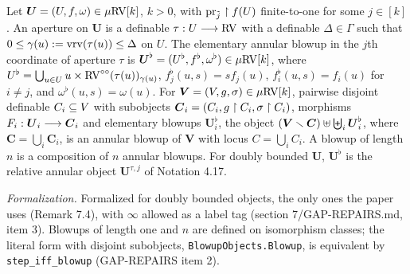 \setcounter{theorem}{1}
\begin{definition}
\label{defn-blowup-coa}
\leanok
{}
Let $\boldsymbol{U} = (U, f, \omega) \in \mu\mathrm{RV}[k]$, $k > 0$, with $\operatorname{pr}_{\tilde j} \upharpoonright f(U)$ finite-to-one for some $j \in [k]$. An aperture on $\boldsymbol{U}$ is a definable $\tau : U \longrightarrow \mathrm{RV}$ with a definable $\Delta \in \Gamma$ such that $0 \leq \gamma(u) := \operatorname{vrv}(\tau(u)) \leq \Delta$ on $U$. The elementary annular blowup in the $j$th coordinate of aperture $\tau$ is $\boldsymbol{U}^\flat = (U^\flat, f^\flat, \omega^\flat) \in \mu\mathrm{RV}[k]$, where $U^\flat = \bigcup_{u \in U} u \times \mathrm{RV}^{\circ\circ}(\tau(u))_{\gamma(u)}$, $f^\flat_j(u, s) = s f_j(u)$, $f^\flat_i(u, s) = f_i(u)$ for $i \neq j$, and $\omega^\flat(u, s) = \omega(u)$. For $\boldsymbol{V} = (V, g, \sigma) \in \mu\mathrm{RV}[k]$, pairwise disjoint definable $C_i \subseteq V$ with subobjects $\boldsymbol{C}_i = (C_i, g \upharpoonright C_i, \sigma \upharpoonright C_i)$, morphisms $F_i : \boldsymbol{U}_i \longrightarrow \boldsymbol{C}_i$ and elementary blowups $\boldsymbol{U}_i^\flat$, the object $(\boldsymbol{V} \smallsetminus \boldsymbol{C}) \uplus \biguplus_i \boldsymbol{U}_i^\flat$, where $\boldsymbol{C} = \bigcup_i \boldsymbol{C}_i$, is an annular blowup of $\boldsymbol{V}$ with locus $C = \bigcup_i C_i$. A blowup of length $n$ is a composition of $n$ annular blowups. For doubly bounded $\boldsymbol{U}$, $\boldsymbol{U}^\flat$ is the relative annular object $\boldsymbol{U}^{\tau, j}$ of Notation 4.17.

\emph{Formalization.} Formalized for doubly bounded objects, the only ones the paper uses (Remark 7.4), with $\infty$ allowed as a label tag (section 7/GAP-REPAIRS.md, item 3). Blowups of length one and $n$ are defined on isomorphism classes; the literal form with disjoint subobjects, \texttt{BlowupObjects.Blowup}, is equivalent by \texttt{step\_iff\_blowup} (GAP-REPAIRS item 2).
\end{definition}

